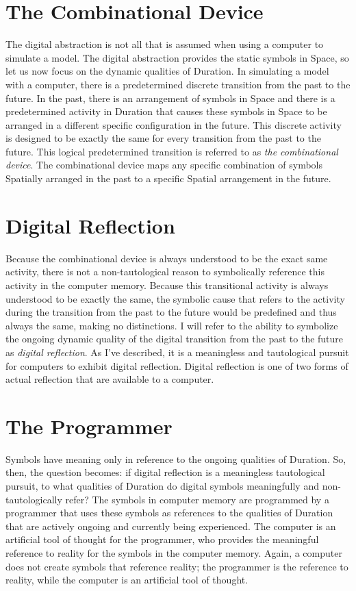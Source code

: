\section{The Combinational Device}

The digital abstraction is not all that is assumed when using a
computer to simulate a model.  The digital abstraction provides the
static symbols in Space, so let us now focus on the dynamic qualities
of Duration.  In simulating a model with a computer, there is a
predetermined discrete transition from the past to the future.  In the
past, there is an arrangement of symbols in Space and there is a
predetermined activity in Duration that causes these symbols in Space
to be arranged in a different specific configuration in the future.
This discrete activity is designed to be exactly the same for every
transition from the past to the future.  This logical predetermined
transition is referred to as \emph{the combinational device}.  The
combinational device maps any specific combination of symbols
Spatially arranged in the past to a specific Spatial arrangement in
the future.

\section{Digital Reflection}
\label{section:digital_reflection}

Because the combinational device is always understood to be the exact
same activity, there is not a non-tautological reason to symbolically
reference this activity in the computer memory.  Because this
transitional activity is always understood to be exactly the same, the
symbolic cause that refers to the activity during the transition from
the past to the future would be predefined and thus always the same,
making no distinctions.  I will refer to the ability to symbolize the
ongoing dynamic quality of the digital transition from the past to the
future as \emph{digital reflection}.  As I've described, it is a
meaningless and tautological pursuit for computers to exhibit digital
reflection.  Digital reflection is one of two forms of actual
reflection that are available to a computer.

\section{The Programmer}

Symbols have meaning only in reference to the ongoing qualities of
Duration.  So, then, the question becomes: if digital reflection is a
meaningless tautological pursuit, to what qualities of Duration do
digital symbols meaningfully and non-tautologically refer?  The
symbols in computer memory are programmed by a programmer that uses
these symbols as references to the qualities of Duration that are
actively ongoing and currently being experienced.  The computer is an
artificial tool of thought for the programmer, who provides the
meaningful reference to reality for the symbols in the computer
memory.  Again, a computer does not create symbols that reference
reality; the programmer is the reference to reality, while the
computer is an artificial tool of thought.
